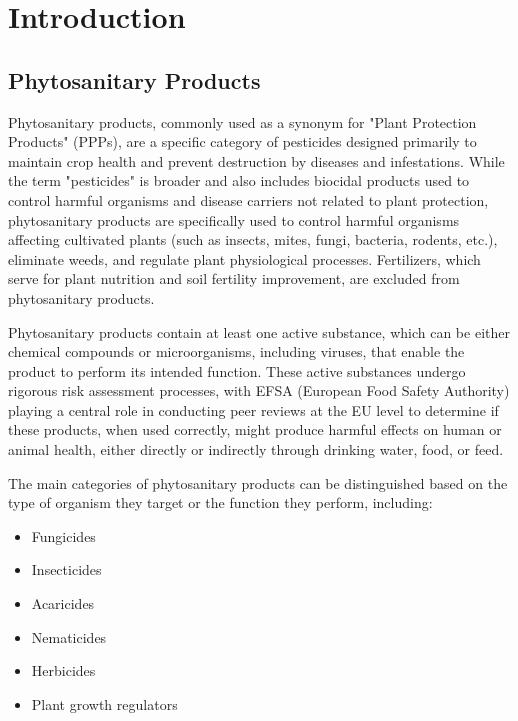 \documentclass[12pt,a4paper,oneside]{report}
\begin{document}


\tableofcontents
\newpage

\chapter{Introduction}

\section{Phytosanitary Products}

Phytosanitary products, commonly used as a synonym for "Plant Protection Products" (PPPs),
are a specific category of pesticides designed primarily to maintain crop health 
and prevent destruction by diseases and infestations. While the term "pesticides" 
is broader and also includes biocidal products used to control harmful organisms 
and disease carriers not related to plant protection, phytosanitary products are 
specifically used to control harmful organisms affecting cultivated plants (such 
as insects, mites, fungi, bacteria, rodents, etc.), eliminate weeds, and regulate 
plant physiological processes. Fertilizers, which serve for plant nutrition and 
soil fertility improvement, are excluded from phytosanitary products.

Phytosanitary products contain at least one active substance, which can be either 
chemical compounds or microorganisms, including viruses, that enable the product 
to perform its intended function. These active substances undergo rigorous risk 
assessment processes, with EFSA (European Food Safety Authority) playing a central 
role in conducting peer reviews at the EU level to determine if these products, 
when used correctly, might produce harmful effects on human or animal health, either 
directly or indirectly through drinking water, food, or feed.

The main categories of phytosanitary products can be distinguished based on the 
type of organism they target or the function they perform, including:


\begin{itemize}
    \item Fungicides
    \item Insecticides
    \item Acaricides
    \item Nematicides
    \item Herbicides
    \item Plant growth regulators
\end{itemize}
\end{document}
